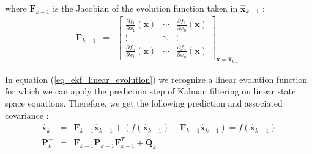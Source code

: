 \documentclass[10pt,oneside]{scrartcl}
\newcommand\vecteur[1]{\boldsymbol#1}
\newcommand\matrice[1]{\mathbf#1}
\begin{document}
where $\matrice{F}_{k-1}$ is the Jacobian of the evolution function taken in $\hat{\vecteur{x}}_{k-1}$ : 
\begin{eqnarray}
\matrice{F}_{k-1} &=& \begin{bmatrix}
\frac{\partial f_1}{\partial x_1}(\vecteur{x}) & \cdots & \frac{\partial f_1}{\partial x_n}(\vecteur{x})\\
\vdots & \ddots & \vdots\\
\frac{\partial f_n}{\partial x_1}(\vecteur{x}) & \cdots & \frac{\partial f_n}{\partial x_n}(\vecteur{x})
\end{bmatrix}_{\vecteur{x} = \hat{\vecteur{x}}_{k-1}} 
\end{eqnarray}

In equation (\ref{eq_ekf_linear_evolution}) we recognize a linear
evolution function for which we can apply the prediction step of
Kalman filtering on linear state space equations. Therefore, we get
the following prediction and associated covariance :
\begin{eqnarray}
\hat{\vecteur{x}}_k^-&=& \matrice{F}_{k-1}\hat{\vecteur{x}}_{k-1} +
( f(\hat{\vecteur{x}}_{k-1}) - \matrice{F}_{k-1}
\hat{\vecteur{x}}_{k-1}) =  f(\hat{\vecteur{x}}_{k-1})
\\
\matrice{P}_k^- &=& \matrice{F}_{k-1} \matrice{P}_{k-1}
\matrice{F}_{k-1}^T + \matrice{Q}_k
\end{eqnarray}
\end{document}
